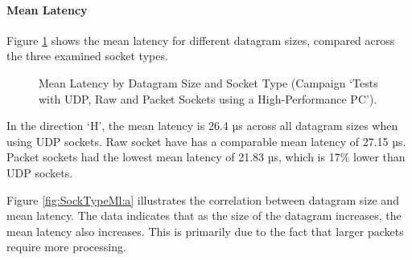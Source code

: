 \paragraph{Mean Latency}

Figure \ref{fig:SockTypeMl} shows the mean latency for different datagram sizes, compared across the three examined socket types.

\begin{figure}[h!]
  \centering
  \caption{Mean Latency by Datagram Size and Socket Type (Campaign `Tests with UDP, Raw and Packet Sockets using a High-Performance PC').}
  \label{fig:SockTypeMl}
\end{figure}

In the direction `H', the mean latency is 26.4 µs across all datagram sizes when using UDP sockets. Raw socket have has a comparable mean latency of 27.15 µs. Packet sockets had the lowest mean latency of 21.83 µs, which is 17\% lower than UDP sockets.

Figure \ref{fig:SockTypeMl:a} illustrates the correlation between datagram size and mean latency. The data indicates that as the size of the datagram increases, the mean latency also increases. This is primarily due to the fact that larger packets require more processing.

